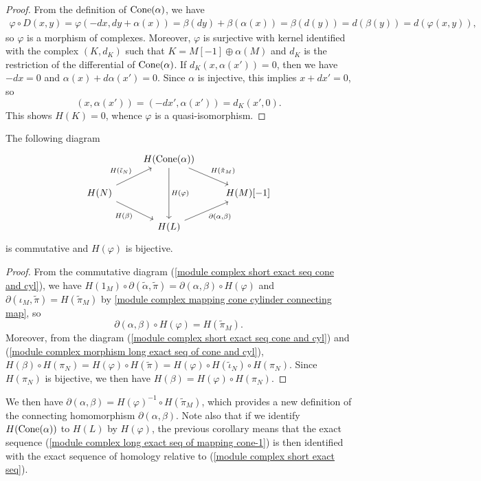 \begin{proof}
From the definition of $\mathrm{Cone}(\alpha)$, we have
\begin{align*}
\varphi\circ D(x,y)=\varphi(-dx,dy+\alpha(x))=\beta(dy)+\beta(\alpha(x))=\beta(d(y))=d(\beta(y))=d(\varphi(x,y)),
\end{align*}
so $\varphi$ is a morphism of complexes. Moreover, $\varphi$ is surjective with kernel identified with the complex $(K,d_K)$ such that $K=M[-1]\oplus \alpha(M)$ and $d_K$ is the restriction of the differential of $\mathrm{Cone}(\alpha)$. If $d_K(x,\alpha(x'))=0$, then we have $-dx=0$ and $\alpha(x)+d\alpha(x')=0$. Since $\alpha$ is injective, this implies $x+dx'=0$, so
\[(x,\alpha(x'))=(-dx',\alpha(x'))=d_K(x',0).\]
This shows $H(K)=0$, whence $\varphi$ is a quasi-isomorphism.
\end{proof}
\begin{corollary}\label{module complex short exact seq cone commutative diagram}
The following diagram
\[\begin{tikzcd}
&H(\Cone(\alpha))\ar[dd,"H(\varphi)"]\ar[rd,"H(\tilde{\pi}_M)"]&\\
H(N)\ar[ru,"H(\tilde{\iota}_N)"]\ar[rd,swap,"H(\beta)"]&&H(M)[-1]\\
&H(L)\ar[ru,swap,"{\partial(\alpha,\beta)}"]&
\end{tikzcd}\]
is commutative and $H(\varphi)$ is bijective.
\end{corollary}
\begin{proof}
From the commutative diagram (\ref{module complex short exact seq cone and cyl}), we have $H(1_{M})\circ\partial(\tilde{\alpha},\tilde{\pi})=\partial(\alpha,\beta)\circ H(\varphi)$ and $\partial(\iota_M,\tilde{\pi})=H(\tilde{\pi}_M)$ by \cref{module complex mapping cone cylinder connecting map}, so
\[\partial(\alpha,\beta)\circ H(\varphi)=H(\tilde{\pi}_M).\]
Moreover, from the diagram (\ref{module complex short exact seq cone and cyl}) and (\ref{module complex morphism long exact seq of cone and cyl}), $H(\beta)\circ H(\pi_N)=H(\varphi)\circ H(\tilde{\pi})=H(\varphi)\circ H(\tilde{\iota}_N)\circ H(\pi_N)$. Since $H(\pi_N)$ is bijective, we then have $H(\beta)=H(\varphi)\circ H(\pi_N)$.
\end{proof}
We then have $\partial(\alpha,\beta)=H(\varphi)^{-1}\circ H(\tilde{\pi}_M)$, which provides a new definition of the connecting homomorphism $\partial(\alpha,\beta)$. Note also that if we identify $H(\mathrm{Cone}(\alpha))$ to $H(L)$ by $H(\varphi)$, the previous corollary means that the exact sequence (\ref{module complex long exact seq of mapping cone-1}) is then identified with the exact sequence of homology relative to (\ref{module complex short exact seq}).
